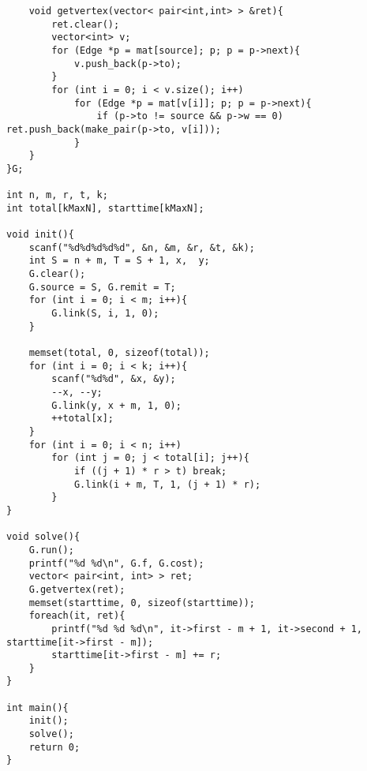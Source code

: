 \begin{verbatim}
    void getvertex(vector< pair<int,int> > &ret){
        ret.clear();
        vector<int> v;
        for (Edge *p = mat[source]; p; p = p->next){
            v.push_back(p->to);
        }
        for (int i = 0; i < v.size(); i++)
            for (Edge *p = mat[v[i]]; p; p = p->next){
                if (p->to != source && p->w == 0) ret.push_back(make_pair(p->to, v[i]));
            }
    }
}G;

int n, m, r, t, k;
int total[kMaxN], starttime[kMaxN];

void init(){
    scanf("%d%d%d%d%d", &n, &m, &r, &t, &k);
    int S = n + m, T = S + 1, x,  y;
    G.clear();
    G.source = S, G.remit = T;
    for (int i = 0; i < m; i++){
        G.link(S, i, 1, 0);
    }

    memset(total, 0, sizeof(total));
    for (int i = 0; i < k; i++){
        scanf("%d%d", &x, &y);
        --x, --y;
        G.link(y, x + m, 1, 0);
        ++total[x];
    }
    for (int i = 0; i < n; i++)
        for (int j = 0; j < total[i]; j++){
            if ((j + 1) * r > t) break;
            G.link(i + m, T, 1, (j + 1) * r);
        }
}

void solve(){
    G.run();
    printf("%d %d\n", G.f, G.cost);
    vector< pair<int, int> > ret;
    G.getvertex(ret);
    memset(starttime, 0, sizeof(starttime));
    foreach(it, ret){
        printf("%d %d %d\n", it->first - m + 1, it->second + 1, starttime[it->first - m]);
        starttime[it->first - m] += r;
    }
}

int main(){
    init();
    solve();
    return 0;
}
\end{verbatim}
